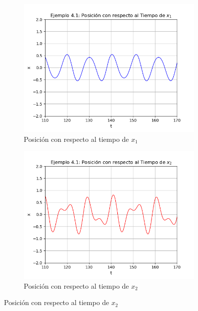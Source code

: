 \documentclass[a4paper]{article}
\begin{document}
\begin{center}
\begin{figure}[ht!]
\begin{subfigure}{0.6\textwidth}
  \includegraphics[width=\linewidth]{ejemplo_4_1_2.png}
  \caption{Posición con respecto al tiempo de $x_1$}
\end{subfigure}
\begin{subfigure}{0.6\textwidth}
  \centering
  \includegraphics[width=\linewidth]{ejemplo_4_1_3.png}
  \caption{Posición con respecto al tiempo de $x_2$}
\end{subfigure}
\end{figure}


\end{center}
\end{document}
